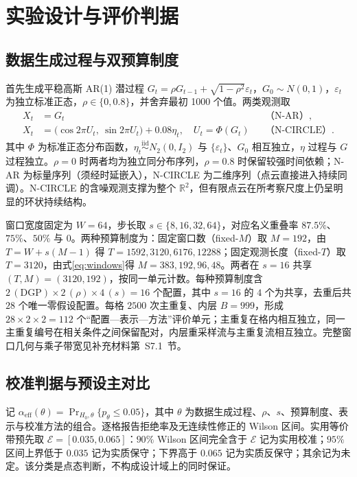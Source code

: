 \section{实验设计与评价判据}\label{sec:protocol}

\subsection{数据生成过程与双预算制度}\label{sec:dgp}
首先生成平稳高斯 AR(1) 潜过程 $G_t=\rho G_{t-1}+\sqrt{1-\rho^2}\varepsilon_t$，$G_0\sim N(0,1)$，$\varepsilon_t$ 为独立标准正态，$\rho\in\{0,0.8\}$，并舍弃最初 1000 个值。两类观测取
\begin{equation}\label{eq:dgp}
\begin{aligned}
 X_t&=G_t &&\text{（N-AR）},\\
 X_t&=\bigl(\cos2\pi U_t,\ \sin2\pi U_t\bigr)+0.08\eta_t,
 \quad U_t=\Phi(G_t) &&\text{（N-CIRCLE）}.
\end{aligned}
\end{equation}
其中 $\Phi$ 为标准正态分布函数，$\eta_t\overset{\mathrm{iid}}{\sim}N_2(0,I_2)$ 与 $\{\varepsilon_t\}$、$G_0$ 相互独立，$\eta$ 过程与 $G$ 过程独立。$\rho=0$ 时两者均为独立同分布序列，$\rho=0.8$ 时保留较强时间依赖；N-AR 为标量序列（须经时延嵌入），N-CIRCLE 为二维序列（点云直接进入持续同调）。N-CIRCLE 的含噪观测支撑为整个 $\mathbb R^2$，但有限点云在所考察尺度上仍呈明显的环状持续结构。

窗口宽度固定为 $W=64$，步长取 $s\in\{8,16,32,64\}$，对应名义重叠率 $87.5\%$、$75\%$、$50\%$ 与 $0$。两种预算制度为：固定窗口数（fixed-$M$）取 $M=192$，由 $T=W+s(M-1)$ 得 $T=1592,3120,6176,12288$；固定观测长度（fixed-$T$）取 $T=3120$，由式\eqref{eq:windows}得 $M=383,192,96,48$。两者在 $s=16$ 共享 $(T,M)=(3120,192)$，按同一单元计数。每种预算制度含 $2\,(\mathrm{DGP})\times2\,(\rho)\times4\,(s)=16$ 个配置，其中 $s=16$ 的 $4$ 个为共享，去重后共 $28$ 个唯一零假设配置。每格 $2500$ 次主重复、内层 $B=999$，形成 $28\times2\times2=112$ 个“配置—表示—方法”评价单元；主重复在格内相互独立，同一主重复编号在相关条件之间保留配对，内层重采样流与主重复流相互独立。完整窗口几何与乘子带宽见补充材料第~S7.1~节。

\subsection{校准判据与预设主对比}\label{sec:criteria}
记 $\alpha_{\mathrm{eff}}(\theta)=\Pr_{H_0,\theta}\{p_\theta\le0.05\}$，其中 $\theta$ 为数据生成过程、$\rho$、$s$、预算制度、表示与校准方法的组合。逐格报告拒绝率及无连续性修正的 Wilson 区间\cite{Wilson1927}。实用等价带预先取 $\mathcal E=[0.035,0.065]$：$90\%$ Wilson 区间完全含于 $\mathcal E$ 记为实用校准；$95\%$ 区间上界低于 $0.035$ 记为实质保守；下界高于 $0.065$ 记为实质反保守；其余记为未定。该分类是点态判断，不构成设计域上的同时保证。

